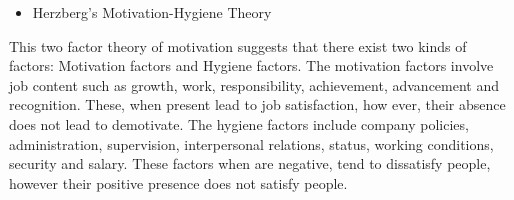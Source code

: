 \documentclass[conference]{IEEEtran}
\begin{document}
\begin{itemize}
\item
  Herzberg's Motivation-Hygiene Theory \cite{herzberg2005motivation}
\end{itemize}

This two factor theory of motivation suggests that there exist two kinds
of factors: Motivation factors and Hygiene factors. The motivation
factors involve job content such as growth, work, responsibility,
achievement, advancement and recognition. These, when present lead to
job satisfaction, how ever, their absence does not lead to demotivate.
The hygiene factors include company policies, administration,
supervision, interpersonal relations, status, working conditions,
security and salary. These factors when are negative, tend to dissatisfy
people, however their positive presence does not satisfy people.
\end{document}
